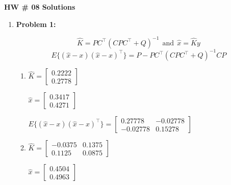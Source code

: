 \documentclass[letterpaper]{article}
\begin{document}
\newcommand{\trace}{\mathrm{trace}}
\newcommand{\real}{\mathbb R}  %
\newcommand{\nat}{\mathbb R}   %
\newcommand{\cp}{\mathbb C}    %
\newcommand{\ds}{\displaystyle}
\newcommand{\mf}[2]{\frac{\ds #1}{\ds #2}}
\newcommand{\book}[2]{{Luenberger, Page~#1, }{Prob.~#2}}
\newcommand{\spanof}[1]{\textrm{span} \{ #1 \}}
\parindent 0pt


\begin{center}
{\large \bf HW \# 08 Solutions}
\end{center}

\vspace*{1cm}

\begin{enumerate}
\item \noindent \textbf{Problem 1:}

$$ \widehat{K}=PC^\top ( C P C^\top + Q)^{-1} ~~\mbox{and}~~ \widehat{x}=  \widehat{K}y$$
$$E\{ (\hat{x}-x)(\hat{x}-x)^\top \}=P - PC^\top(CPC^\top + Q)^{-1}CP$$


\begin{enumerate}
\setlength{\itemsep}{.1in}
\renewcommand{\labelenumi}{(\alph{enumi})}

\item  %

$\widehat{K} =
\left[ \begin{array}{r}0.2222\\0.2778\end{array} \right]$

$\widehat{x} =
\left[ \begin{array}{r}0.3417\\0.4271\end{array} \right]$


$E\{ (\hat{x}-x)(\hat{x}-x)^\top \}=
\left[ \begin{array}{rr}0.27778& -0.02778\\-0.02778& 0.15278\end{array} \right]$


\item %

$\widehat{K} =
\left[ \begin{array}{rr}-0.0375& 0.1375\\0.1125& 0.0875\end{array} \right]$



$\widehat{x} =
\left[ \begin{array}{r}0.4504\\0.4963\end{array} \right]
$



\end{enumerate}
\end{enumerate}
\end{document}
